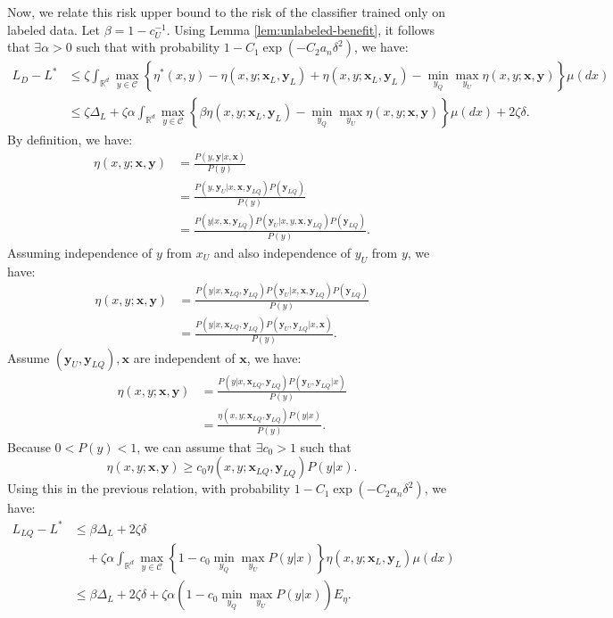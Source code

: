 	Now, we relate this risk upper bound to the risk of the classifier trained only on labeled data. Let $\beta = 1 - c_U^{-1}$. Using Lemma \ref{lem:unlabeled-benefit}, it follows that $\exists \alpha > 0$ such that with probability $1 - C_1 \exp(-C_2 a_n \delta^2)$, we have:
	\begin{align}
		L_D - L^* &\le \zeta \int_{\mathbb{R}^d} \max_{y \in \mathcal{C}} \left\{ \eta^*(x, y) - \eta(x, y; \mathbf{x}_L, \mathbf{y}_L) + \eta(x, y; \mathbf{x}_L, \mathbf{y}_L) - \min_{y_Q} \max_{y_U} \eta(x, y; \mathbf{x}, \mathbf{y}) \right\} \mu(dx) \\
		&\le \zeta \Delta_L + \zeta \alpha \int_{\mathbb{R}^d} \max_{y \in \mathcal{C}} \left\{ \beta \eta(x, y; \mathbf{x}_L, \mathbf{y}_L) - \min_{y_Q} \max_{y_U} \eta(x, y; \mathbf{x}, \mathbf{y}) \right\} \mu(dx) + 2\zeta \delta.
	\end{align}
	By definition, we have:
	\begin{align}
		\eta(x, y; \mathbf{x}, \mathbf{y}) &= \frac{P(y, \mathbf{y}|x, \mathbf{x})}{P(y)} \\
		&= \frac{P(y, \mathbf{y}_U|x, \mathbf{x}, \mathbf{y}_{LQ}) P(\mathbf{y}_{LQ})}{P(y)} \\
		&= \frac{P(y|x, \mathbf{x}, \mathbf{y}_{LQ}) P(\mathbf{y}_U|x, y, \mathbf{x}, \mathbf{y}_{LQ}) P(\mathbf{y}_{LQ})}{P(y)}.
	\end{align}
	Assuming independence of $y$ from $x_U$ and also independence of $y_U$ from $y$, we have:
	\begin{align}
		\eta(x, y; \mathbf{x}, \mathbf{y}) &= \frac{P(y|x, \mathbf{x}_{LQ}, \mathbf{y}_{LQ}) P(\mathbf{y}_U|x, \mathbf{x}, \mathbf{y}_{LQ}) P(\mathbf{y}_{LQ})}{P(y)} \\
		&= \frac{P(y|x, \mathbf{x}_{LQ}, \mathbf{y}_{LQ}) P(\mathbf{y}_U, \mathbf{y}_{LQ}|x, \mathbf{x})}{P(y)}.
	\end{align}
	Assume $(\mathbf{y}_U, \mathbf{y}_{LQ}), \mathbf{x}$ are independent of $\mathbf{x}$, we have:
	\begin{align}
		\eta(x, y; \mathbf{x}, \mathbf{y}) &= \frac{P(y|x, \mathbf{x}_{LQ}, \mathbf{y}_{LQ}) P(\mathbf{y}_U, \mathbf{y}_{LQ}|x)}{P(y)} \\
		&= \frac{\eta(x, y; \mathbf{x}_{LQ}, \mathbf{y}_{LQ}) P(y|x)}{P(y)}.
	\end{align}
	Because $0 < P(y) < 1$, we can assume that $\exists c_0 > 1$ such that
	\begin{equation}
		\eta(x, y; \mathbf{x}, \mathbf{y}) \ge c_0 \eta(x, y; \mathbf{x}_{LQ}, \mathbf{y}_{LQ}) P(y|x).
	\end{equation}
	Using this in the previous relation, with probability $1 - C_1 \exp(-C_2 a_n \delta^2)$, we have:
	\begin{align}
		L_{LQ} - L^* &\le \beta \Delta_L + 2\zeta \delta \\
		&\quad + \zeta \alpha \int_{\mathbb{R}^d} \max_{y \in \mathcal{C}} \left\{ 1 - c_0 \min_{y_Q} \max_{y_U} P(y|x) \right\} \eta(x, y; \mathbf{x}_L, \mathbf{y}_L) \mu(dx) \\
		&\le \beta \Delta_L + 2\zeta \delta + \zeta \alpha \left( 1 - c_0 \min_{y_Q} \max_{y_U} P(y|x) \right) E_\eta.
	\end{align}
	
